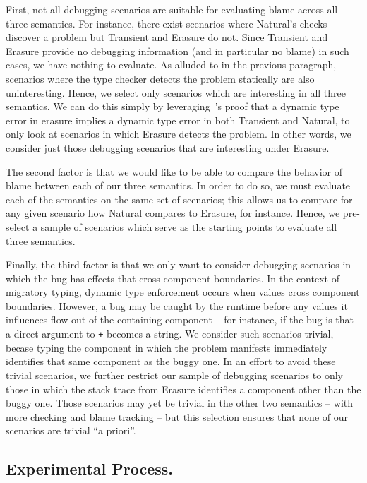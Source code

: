 First, not all debugging scenarios are suitable for evaluating blame across all three semantics.
For instance, there exist scenarios where Natural's checks discover a problem but Transient and Erasure do not.
Since Transient and Erasure provide no debugging information (and in particular no blame) in such cases, we have nothing to evaluate.
As alluded to in the previous paragraph, scenarios where the type checker detects the problem statically are also uninteresting.
Hence, we select only scenarios which are interesting in all three semantics.
We can do this simply by leveraging~\citet{??? Ben}'s proof that a dynamic type error in erasure implies a dynamic type error in both Transient and Natural, to only look at scenarios in which Erasure detects the problem.
In other words, we consider just those debugging scenarios that are interesting under Erasure.

The second factor is that we would like to be able to compare the behavior of blame between each of our three semantics.
In order to do so, we must evaluate each of the semantics on the same set of scenarios;
this allows us to compare for any given scenario how Natural compares to Erasure, for instance.
Hence, we pre-select a sample of scenarios which serve as the starting points to evaluate all three semantics.

Finally, the third factor is that we only want to consider debugging scenarios in which the bug has effects that cross component boundaries.
In the context of migratory typing, dynamic type enforcement occurs when values cross component boundaries.
However, a bug may be caught by the runtime before any values it influences flow out of the containing component -- for instance, if the bug is that a direct argument to \texttt{+} becomes a string.
We consider such scenarios trivial, becase typing the component in which the problem manifests immediately identifies that same component as the buggy one.
In an effort to avoid these trivial scenarios, we further restrict our sample of debugging scenarios to only those in which the stack trace from Erasure identifies a component other than the buggy one.
Those scenarios may yet be trivial in the other two semantics -- with more checking and blame tracking -- but this selection ensures that none of our scenarios are trivial ``a priori''.




\subsection{Experimental Process.}

